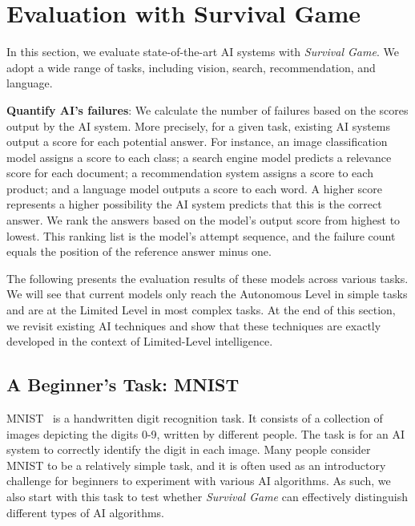 \section{Evaluation with Survival Game}
\label{sec:evaluate_current_ai}


In this section, we evaluate state-of-the-art AI systems with \textit{Survival Game}. We adopt a wide range of tasks, including vision, search, recommendation, and language. 

\textbf{Quantify AI's failures}:
We calculate the number of failures based on the scores output by the AI system. More precisely, for a given task, existing AI systems output a score for each potential answer. For instance, an image classification model assigns a score to each class; a search engine model predicts a relevance score for each document; a recommendation system assigns a score to each product; and a language model outputs a score to each word. A higher score represents a higher possibility the AI system predicts that this is the correct answer. We rank the answers based on the model's output score from highest to lowest. This ranking list is the model's attempt sequence, and the failure count equals the position of the reference answer minus one. 

The following presents the evaluation results of these models across various tasks. We will see that current models only reach the Autonomous Level in simple tasks and are at the Limited Level in most complex tasks. At the end of this section, we revisit existing AI techniques and show that these techniques are exactly developed in the context of Limited-Level intelligence.

\subsection{A Beginner's Task: MNIST}



MNIST~\citep{deng2012mnist} is a handwritten digit recognition task. It consists of a collection of images depicting the digits 0-9, written by different people. The task is for an AI system to correctly identify the digit in each image. Many people consider MNIST to be a relatively simple task, and it is often used as an introductory challenge for beginners to experiment with various AI algorithms. As such, we also start with this task to test whether \textit{Survival Game} can effectively distinguish different types of AI algorithms.

